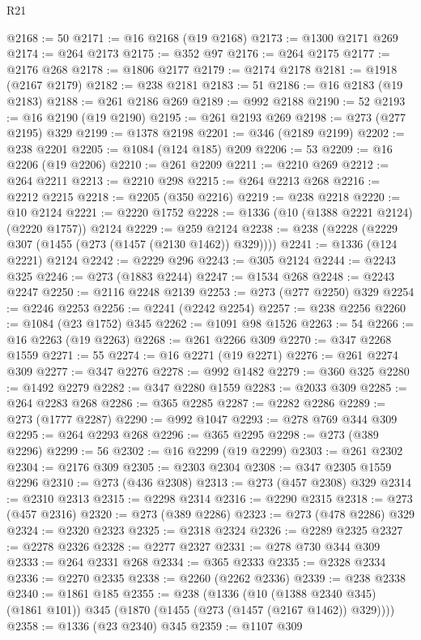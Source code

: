 \begin{lexlean}{R21}
\begin{coremodule}
{{{{{{{{{{{{{{{{{{{@2168 := 50
@2171 := @16 @2168 (@19 @2168)
@2173 := @1300 @2171 @269
@2174 := @264 @2173
@2175 := @352 @97
@2176 := @264 @2175
@2177 := @2176 @268
@2178 := @1806 @2177
@2179 := @2174 @2178
@2181 := @1918 (@2167 @2179)
@2182 := @238 @2181
@2183 := 51
@2186 := @16 @2183 (@19 @2183)
@2188 := @261 @2186 @269
@2189 := @992 @2188
@2190 := 52
@2193 := @16 @2190 (@19 @2190)
@2195 := @261 @2193 @269
@2198 := @273 (@277 @2195) @329
@2199 := @1378 @2198
@2201 := @346 (@2189 @2199)
@2202 := @238 @2201
@2205 := @1084 (@124 @185) @209
@2206 := 53
@2209 := @16 @2206 (@19 @2206)
@2210 := @261 @2209
@2211 := @2210 @269
@2212 := @264 @2211
@2213 := @2210 @298
@2215 := @264 @2213 @268
@2216 := @2212 @2215
@2218 := @2205 (@350 @2216)
@2219 := @238 @2218
@2220 := @10 @2124
@2221 := @2220 @1752
@2228 := @1336 (@10 (@1388 @2221 @2124) (@2220 @1757)) @2124
@2229 := @259 @2124
@2238 := @238 (@2228 (@2229 @307 (@1455 (@273 (@1457 (@2130 @1462)) @329))))
@2241 := @1336 (@124 @2221) @2124
@2242 := @2229 @296
@2243 := @305 @2124
@2244 := @2243 @325
@2246 := @273 (@1883 @2244)
@2247 := @1534 @268
@2248 := @2243 @2247
@2250 := @2116 @2248 @2139
@2253 := @273 (@277 @2250) @329
@2254 := @2246 @2253
@2256 := @2241 (@2242 @2254)
@2257 := @238 @2256
@2260 := @1084 (@23 @1752) @345
@2262 := @1091 @98 @1526
@2263 := 54
@2266 := @16 @2263 (@19 @2263)
@2268 := @261 @2266 @309
@2270 := @347 @2268 @1559
@2271 := 55
@2274 := @16 @2271 (@19 @2271)
@2276 := @261 @2274 @309
@2277 := @347 @2276
@2278 := @992 @1482
@2279 := @360 @325
@2280 := @1492 @2279
@2282 := @347 @2280 @1559
@2283 := @2033 @309
@2285 := @264 @2283 @268
@2286 := @365 @2285
@2287 := @2282 @2286
@2289 := @273 (@1777 @2287)
@2290 := @992 @1047
@2293 := @278 @769 @344 @309
@2295 := @264 @2293 @268
@2296 := @365 @2295
@2298 := @273 (@389 @2296)
@2299 := 56
@2302 := @16 @2299 (@19 @2299)
@2303 := @261 @2302
@2304 := @2176 @309
@2305 := @2303 @2304
@2308 := @347 @2305 @1559 @2296
@2310 := @273 (@436 @2308)
@2313 := @273 (@457 @2308) @329
@2314 := @2310 @2313
@2315 := @2298 @2314
@2316 := @2290 @2315
@2318 := @273 (@457 @2316)
@2320 := @273 (@389 @2286)
@2323 := @273 (@478 @2286) @329
@2324 := @2320 @2323
@2325 := @2318 @2324
@2326 := @2289 @2325
@2327 := @2278 @2326
@2328 := @2277 @2327
@2331 := @278 @730 @344 @309
@2333 := @264 @2331 @268
@2334 := @365 @2333
@2335 := @2328 @2334
@2336 := @2270 @2335
@2338 := @2260 (@2262 @2336)
@2339 := @238 @2338
@2340 := @1861 @185
@2355 := @238
    (@1336
      (@10 (@1388 @2340 @345) (@1861 @101))
      @345
      (@1870 (@1455 (@273 (@1457 (@2167 @1462)) @329))))
@2358 := @1336 (@23 @2340) @345
@2359 := @1107 @309
}}}}}}}}}}}}}}}}}}}
\end{coremodule}
\end{lexlean}
